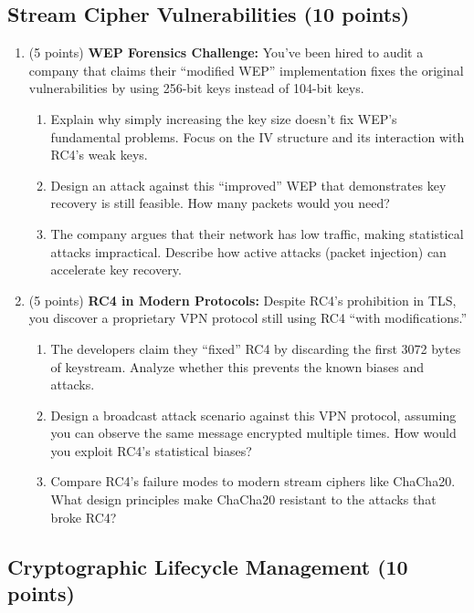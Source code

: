 \documentclass[10pt,a4paper,american]{exam}
\begin{document}
\subsection{Stream Cipher Vulnerabilities (10 points)}

\begin{enumerate}
	\item (5 points) \textbf{WEP Forensics Challenge:}
	      You've been hired to audit a company that claims their ``modified WEP'' implementation fixes the original vulnerabilities by using 256-bit keys instead of 104-bit keys.
	      \begin{enumerate}
		      \item Explain why simply increasing the key size doesn't fix WEP's fundamental problems. Focus on the IV structure and its interaction with RC4's weak keys.
		      \item Design an attack against this ``improved'' WEP that demonstrates key recovery is still feasible. How many packets would you need?
		      \item The company argues that their network has low traffic, making statistical attacks impractical. Describe how active attacks (packet injection) can accelerate key recovery.
	      \end{enumerate}
	\item (5 points) \textbf{RC4 in Modern Protocols:}
	      Despite RC4's prohibition in TLS, you discover a proprietary VPN protocol still using RC4 ``with modifications.''
	      \begin{enumerate}
		      \item The developers claim they ``fixed'' RC4 by discarding the first 3072 bytes of keystream. Analyze whether this prevents the known biases and attacks.
		      \item Design a broadcast attack scenario against this VPN protocol, assuming you can observe the same message encrypted multiple times. How would you exploit RC4's statistical biases?
		      \item Compare RC4's failure modes to modern stream ciphers like ChaCha20. What design principles make ChaCha20 resistant to the attacks that broke RC4?
	      \end{enumerate}
\end{enumerate}

\subsection{Cryptographic Lifecycle Management (10 points)}
\end{document}

